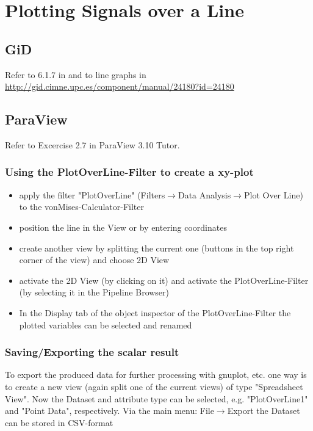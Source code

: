 \section{Plotting Signals over a Line}

\subsection{GiD}

Refer   to   6.1.7   in   \cite{Simkovics2010}   and   to   line   graphs   in
\url{http://gid.cimne.upc.es/component/manual/24180?id=24180}

\subsection{ParaView}

Refer to Excercise 2.7 in ParaView 3.10 Tutor.

\subsubsection{Using the PlotOverLine-Filter to create a xy-plot}

\begin{itemize}
\item    apply    the    filter    "PlotOverLine"    (Filters$\rightarrow$Data
  Analysis$\rightarrow$Plot Over Line) to the vonMises-Calculator-Filter
\item position the line in the View or by entering coordinates
\item create  another view by  splitting the current  one (buttons in  the top
  right corner of the view) and choose 2D View
\item  activate   the  2D  View   (by  clicking   on  it)  and   activate  the
  PlotOverLine-Filter (by selecting it in the Pipeline Browser)
\item In  the Display tab of  the object inspector of  the PlotOverLine-Filter
  the plotted variables can be selected and renamed
\end{itemize}

\subsubsection{Saving/Exporting the scalar result}
\label{sec:pv_export_xy_data}
To export the produced data for  further processing with gnuplot, etc. one way
is  to create  a new  view (again  split  one of  the current  views) of  type
"Spreadsheet  View". Now  the  Dataset  and attribute  type  can be  selected,
e.g.  "PlotOverLine1"  and "Point  Data",  respectively.  Via  the main  menu:
File$\rightarrow$Export the Dataset can be stored in CSV-format


